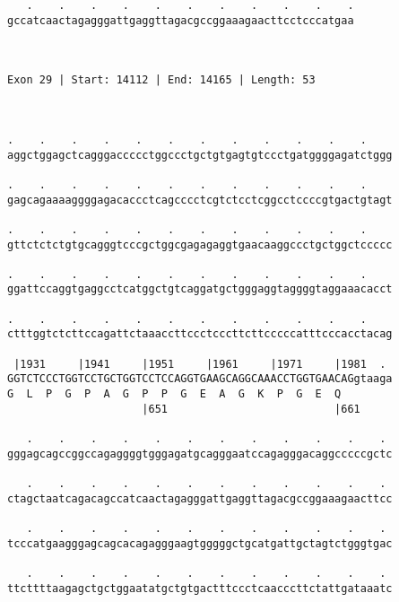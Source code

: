 \documentclass{article}
\begin{document}
\begin{Verbatim}
   .    .    .    .    .    .    .    .    .    .    .
gccatcaactagagggattgaggttagacgccggaaagaacttcctcccatgaa
                                                      
                                                      
 
Exon 29 | Start: 14112 | End: 14165 | Length: 53



.    .    .    .    .    .    .    .    .    .    .    .    
aggctggagctcagggaccccctggccctgctgtgagtgtccctgatggggagatctggg
                                                            
.    .    .    .    .    .    .    .    .    .    .    .    
gagcagaaaaggggagacaccctcagcccctcgtctcctcggcctccccgtgactgtagt
                                                            
.    .    .    .    .    .    .    .    .    .    .    .    
gttctctctgtgcagggtcccgctggcgagagaggtgaacaaggccctgctggctccccc
                                                            
.    .    .    .    .    .    .    .    .    .    .    .    
ggattccaggtgaggcctcatggctgtcaggatgctgggaggtaggggtaggaaacacct
                                                            
.    .    .    .    .    .    .    .    .    .    .    .    
ctttggtctcttccagattctaaaccttccctcccttcttcccccatttcccacctacag
                                                            
 |1931     |1941     |1951     |1961     |1971     |1981  . 
GGTCTCCCTGGTCCTGCTGGTCCTCCAGGTGAAGCAGGCAAACCTGGTGAACAGgtaaga
G  L  P  G  P  A  G  P  P  G  E  A  G  K  P  G  E  Q        
                     |651                          |661     
  
   .    .    .    .    .    .    .    .    .    .    .    . 
gggagcagccggccagaggggtgggagatgcagggaatccagagggacaggcccccgctc
                                                            
   .    .    .    .    .    .    .    .    .    .    .    . 
ctagctaatcagacagccatcaactagagggattgaggttagacgccggaaagaacttcc
                                                            
   .    .    .    .    .    .    .    .    .    .    .    . 
tcccatgaagggagcagcacagagggaagtgggggctgcatgattgctagtctgggtgac
                                                            
   .    .    .    .    .    .    .    .    .    .    .    . 
ttcttttaagagctgctggaatatgctgtgactttccctcaacccttctattgataaatc
                                                            

\end{Verbatim}
\end{document}
